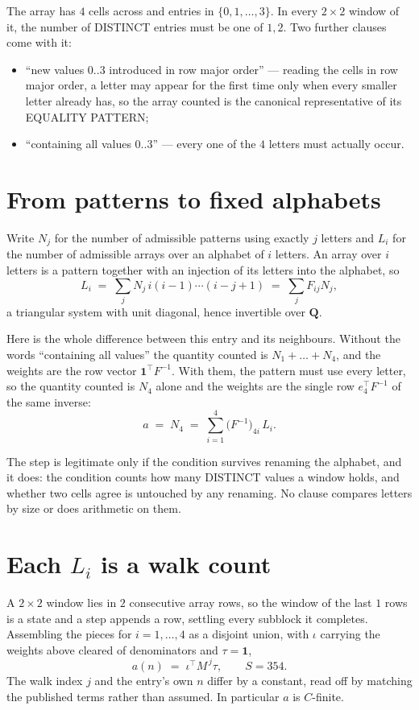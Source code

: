 \documentclass[11pt,a4paper]{article}
\theoremstyle{plain}
\theoremstyle{definition}
\begin{document}
The array has $4$ cells across and entries in $\{0,1,\dots,3\}$. In every
$2\times2$ window of it, the number of DISTINCT entries must be one of $1, 2$. Two
further clauses come with it:

\begin{itemize}
\item ``new values $0..3$ introduced in row major order'' --- reading the cells in row major
order, a letter may appear for the first time only when every smaller letter already has, so
the array counted is the canonical representative of its EQUALITY PATTERN;
\item ``containing all values $0..3$'' --- every one of the $4$ letters must actually
occur.
\end{itemize}


\section{From patterns to fixed alphabets}

Write $N_j$ for the number of admissible patterns using exactly $j$ letters and $L_i$ for the
number of admissible arrays over an alphabet of $i$ letters. An array over $i$ letters is a
pattern together with an injection of its letters into the alphabet, so
\[
L_i\;=\;\sum_{j} N_j\,i(i-1)\cdots(i-j+1)\;=\;\sum_j F_{ij}N_j ,
\]
a triangular system with unit diagonal, hence invertible over $\mathbf{Q}$.

Here is the whole difference between this entry and its neighbours. Without the words
``containing all values'' the quantity counted is $N_1+\dots+N_{4}$, and the weights are
the row vector $\mathbf{1}^{\!\top}F^{-1}$. With them, the pattern must use every letter,
so the quantity counted is $N_{4}$ alone and the weights are the single row
$e_{4}^{\!\top}F^{-1}$ of the same inverse:
\[
a\;=\;N_{4}\;=\;\sum_{i=1}^{4}\bigl(F^{-1}\bigr)_{4i}\,L_i .
\]

The step is legitimate only if the condition survives renaming the alphabet, and it does: the
condition counts how many DISTINCT values a window holds, and whether two cells agree is
untouched by any renaming. No clause compares letters by size or does arithmetic on them.

\section{Each $L_i$ is a walk count}

A $2\times2$ window lies in $2$ consecutive array rows, so the window of the last
$1$ rows is a state and a step appends a row, settling every subblock it completes.
Assembling the pieces for $i=1,\dots,4$ as a disjoint union, with $\iota$ carrying the
weights above cleared of denominators and $\tau=\mathbf{1}$,
\[
a(n)\;=\;\iota^{\!\top}M^{\,j}\tau ,\qquad S=354.
\]
The walk index $j$ and the entry's own $n$ differ by a constant, read off by matching the
published terms rather than assumed. In particular $a$ is $C$-finite.
\end{document}
